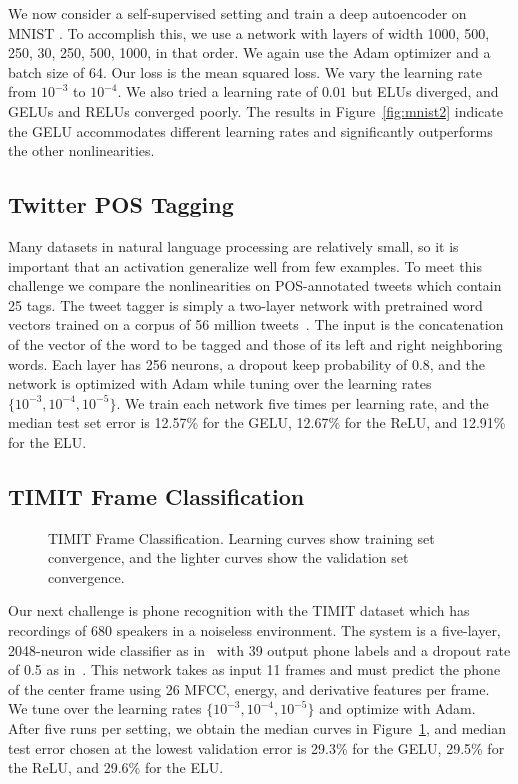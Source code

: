 \documentclass{article}
\begin{document}
We now consider a self-supervised setting and train a deep autoencoder on MNIST \citep{desjardens}. To accomplish this, we use a network with layers of width 1000, 500, 250, 30, 250, 500, 1000, in that order. We again use the Adam optimizer and a batch size of 64. Our loss is the mean squared loss. We vary the learning rate from $10^{-3}$ to $10^{-4}$. We also tried a learning rate of $0.01$ but ELUs diverged, and GELUs and RELUs converged poorly. The results in Figure~\ref{fig:mnist2} indicate the GELU accommodates different learning rates and significantly outperforms the other nonlinearities.%

\subsection{Twitter POS Tagging}
Many datasets in natural language processing are relatively small, so it is important that an activation generalize well from few examples. To meet this challenge we compare the nonlinearities on POS-annotated tweets \citep{gimpel,owoputi} which contain 25 tags. The tweet tagger is simply a two-layer network with pretrained word vectors trained on a corpus of 56 million tweets~\citep{owoputi}. 
The input is the concatenation of the vector of the word to be tagged and those of its left and right neighboring words. %
Each layer has 256 neurons, a dropout keep probability of 0.8, and the network is optimized with Adam while tuning over the learning rates $\{10^{-3}, 10^{-4}, 10^{-5}\}$. We train each network five times per learning rate, and the median test set error is 12.57\% for the GELU, 12.67\% for the ReLU, and 12.91\% for the ELU.

\subsection{TIMIT Frame Classification}

\begin{figure}
	\centering
	\noindent{}
	\caption{TIMIT Frame Classification. Learning curves show training set convergence, and the lighter curves show the validation set convergence.}\label{fig:timit}
\end{figure}

Our next challenge is phone recognition with the TIMIT dataset which has recordings of 680 speakers in a noiseless environment. The system is a five-layer, 2048-neuron wide classifier as in~\citep{timitdeep} with 39 output phone labels and a dropout rate of 0.5 as in~\citep{srivastava}. This network takes as input 11 frames and must predict the phone of the center frame using 26 MFCC, energy, and derivative features per frame. We tune over the learning rates $\{10^{-3},10^{-4},10^{-5}\}$ and optimize with Adam. After five runs per setting, we obtain the median curves in Figure~\ref{fig:timit}, and median test error chosen at the lowest validation error is 29.3\% for the GELU, 29.5\% for the ReLU, and 29.6\% for the ELU.
\end{document}
